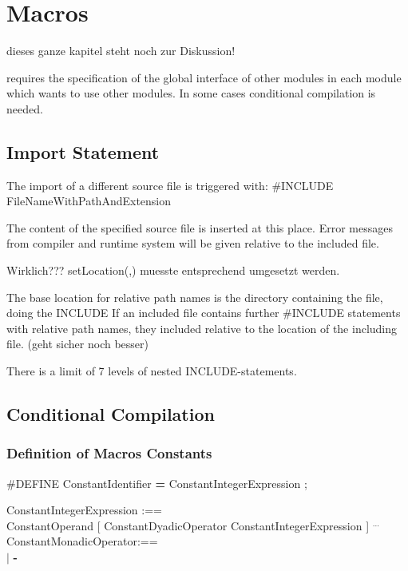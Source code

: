 \chapter{Macros}
\begin{discuss}
dieses ganze kapitel steht noch zur Diskussion!
\end{discuss}

\OpenPEARL{} requires the specification of the global interface 
of other modules in each module which wants to use other modules.
In some cases conditional compilation is needed. 


\section{Import Statement}

The import of a different source file is triggered with:
\#INCLUDE FileNameWithPathAndExtension

The content of the specified source file is inserted at this 
place. Error messages from compiler and runtime system will  be given 
relative to the included file.

Wirklich??? setLocation(,) muesste entsprechend umgesetzt werden.

The base location for relative path names is the directory containing 
the file, doing the INCLUDE  
If an included file contains further \#INCLUDE statements with relative
path names, they included relative to the location of the including file.
(geht sicher noch besser)

There is a limit of 7 levels of nested INCLUDE-statements.

\section{Conditional Compilation}

\subsection{Definition of Macros Constants}
\#DEFINE ConstantIdentifier {\bf = } ConstantIntegerExpression ;

ConstantIntegerExpression :== \\
\x [ ConstantMonadicOperator ] ConstantOperand  [ 
 ConstantDyadicOperator ConstantIntegerExpression  ] $^{...}$\\

ConstantMonadicOperator:== \\
\x {\bf +} $\mid$ {\bf -}

